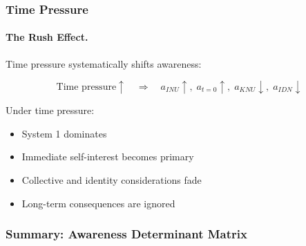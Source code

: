 \subsubsection{Time Pressure}

\paragraph{The Rush Effect.}
Time pressure systematically shifts awareness:

\begin{equation}
\text{Time pressure} \uparrow \quad \Rightarrow \quad a_{INU} \uparrow, \; a_{t=0} \uparrow, \; a_{KNU} \downarrow, \; a_{IDN} \downarrow
\end{equation}

Under time pressure:
\begin{itemize}
\item System 1 dominates
\item Immediate self-interest becomes primary
\item Collective and identity considerations fade
\item Long-term consequences are ignored
\end{itemize}

\subsubsection{Summary: Awareness Determinant Matrix}

